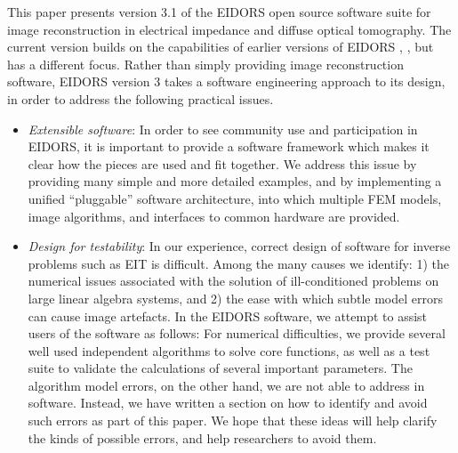 \documentclass[12pt]{iopart}
\begin{document}
This paper presents version 3.1 of the EIDORS
open source software suite for image reconstruction
in electrical impedance and diffuse optical tomography.
The current version builds on the capabilities of
earlier versions of EIDORS \cite{Vauhkonen_etal_2000},
\cite{Polydorides_and_Lionheart_2002}, but
has a different focus. Rather than
simply providing image reconstruction software, 
EIDORS version 3 takes a software engineering
approach to its design, in order to address the
following practical issues.

\begin{itemize}

  \item {\em Extensible software}:
  In order to see community use and participation
  in EIDORS, it is important to provide a 
  software framework which makes it clear how
  the pieces are used and fit together.
  We address this issue by providing many simple
  and more detailed examples, and by implementing
  a unified ``pluggable'' software architecture,
  into which multiple FEM models, image algorithms, and
  interfaces to common hardware are provided.

  \item {\em Design for testability}:
  In our experience, correct design of software for
  inverse problems such as EIT is difficult. Among the
  many causes we identify: 1) the numerical issues associated
  with the solution of ill-conditioned problems on
  large linear algebra systems, and 2) the ease with which
  subtle model errors can cause image artefacts.
  In the EIDORS software, we attempt to assist 
  users of the software as follows:
  For numerical difficulties, we provide several well used independent
  algorithms to solve core functions, as well as a test suite
  to validate the calculations of several important parameters.
  The algorithm model errors, on the other
  hand, we are not able to address in software. Instead, we
  have written a section on how to identify and avoid such
  errors as part of this paper.
  We hope that these ideas will help clarify the kinds of
  possible errors, and help researchers to avoid them.

\end{itemize}
\end{document}
